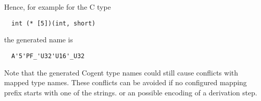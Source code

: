Hence, for example for the C type
\begin{verbatim}
  int (* [5])(int, short)
\end{verbatim}
the generated name is
\begin{verbatim}
  A'5'PF_'U32'U16'_U32
\end{verbatim}

Note that the generated Cogent type names could still cause conflicts with mapped type names. These conflicts can be
avoided if no configured mapping prefix starts with one of the  strings. 
or an possible encoding of a derivation step.

